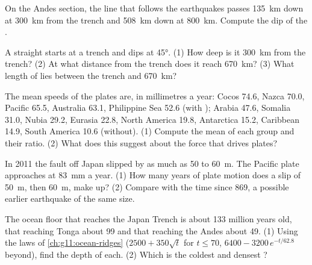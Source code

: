 \begin{exercise}[$\star\star$]\label{exo:g11:subduction-zones:6}
On the Andes section, the line that follows the earthquakes passes
\qty{135}{km} down at \qty{300}{km} from the trench and \qty{508}{km} down at
\qty{800}{km}. Compute the dip of the .
\end{exercise}

\begin{exercise}[$\star\star$]\label{exo:g11:subduction-zones:7}
A straight  starts at a trench and dips at \ang{45}. (1) How deep is it
\qty{300}{km} from the trench? (2) At what distance from the trench does it
reach \qty{670}{km}? (3) What length of  lies between the trench and
\qty{670}{km}?
\end{exercise}

\begin{exercise}[$\star\star$]\label{exo:g11:subduction-zones:8}
The mean speeds of the plates are, in millimetres a year: Cocos 74.6, Nazca
70.0, Pacific 65.5, Australia 63.1, Philippine Sea 52.6 (with ); Arabia
47.6, Somalia 31.0, Nubia 29.2, Eurasia 22.8, North America 19.8, Antarctica
15.2, Caribbean 14.9, South America 10.6 (without). (1) Compute the mean of
each group and their ratio. (2) What does this suggest about the force that
drives plates?
\end{exercise}

\begin{exercise}[$\star\star$]\label{exo:g11:subduction-zones:9}
In 2011 the fault off Japan slipped by as much as 50 to \qty{60}{m}. The
Pacific plate approaches at \qty{83}{mm} a year. (1) How many years of plate
motion does a slip of \qty{50}{m}, then \qty{60}{m}, make up? (2) Compare with
the time since 869, a possible earlier earthquake of the same size.
\end{exercise}

\begin{exercise}[$\star\star$]\label{exo:g11:subduction-zones:10}
The ocean floor that reaches the Japan Trench is about 133 million years old,
that reaching Tonga about 99 and that reaching the Andes about 49. (1) Using
the laws of \cref{ch:g11:ocean-ridges} ($2500 + 350\sqrt{t}$ for
$t \le 70$, $6400 - 3200\,e^{-t/62.8}$ beyond), find the depth of each. (2)
Which is the coldest and densest ?
\end{exercise}

